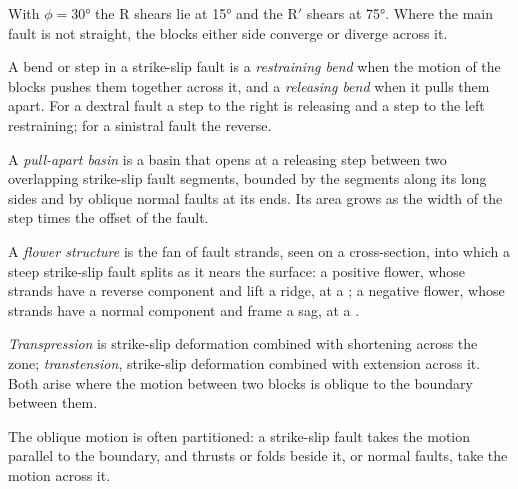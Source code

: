 With $\phi = \ang{30}$ the R shears lie at \ang{15} and the R$'$ shears at
\ang{75}. Where the main fault is not straight, the blocks either side
converge or diverge across it.

\begin{definition}\label{def:b3:extension-strike-slip:bends}
A bend or step in a strike-slip fault is a \emph{restraining
bend} when the motion of the blocks pushes them
together across it, and a \emph{releasing bend} when it
pulls them apart. For a dextral fault a step to the right is releasing and a
step to the left restraining; for a sinistral fault the reverse.
\end{definition}

\begin{definition}\label{def:b3:extension-strike-slip:pull-apart}
A \emph{pull-apart basin} is a basin that opens at a
releasing step between two overlapping strike-slip fault segments, bounded by
the segments along its long sides and by oblique normal faults at its ends.
Its area grows as the width of the step times the offset of the fault.
\end{definition}

\begin{definition}\label{def:b3:extension-strike-slip:flower}
A \emph{flower structure} is the fan of fault strands,
seen on a cross-section, into which a steep strike-slip fault splits as it
nears the surface: a positive flower, whose strands have a reverse component
and lift a ridge, at a ; a negative flower, whose strands have
a normal component and frame a sag, at a .
\end{definition}

\begin{definition}\label{def:b3:extension-strike-slip:transpression}
\emph{Transpression} is strike-slip deformation combined
with shortening across the zone; \emph{transtension},
strike-slip deformation combined with extension across it. Both arise where
the motion between two blocks is oblique to the boundary between them.
\end{definition}

The oblique motion is often partitioned: a strike-slip fault takes the motion
parallel to the boundary, and thrusts or folds beside it, or normal faults,
take the motion across it.


